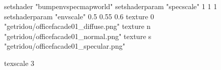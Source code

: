 setshader "bumpenvspecmapworld"
setshaderparam "specscale" 1 1 1
setshaderparam "envscale"  0.5 0.55 0.6
    texture 0 "getridou/officefacade01_diffuse.png"
    texture n "getridou/officefacade01_normal.png"
    texture s "getridou/officefacade01_specular.png"

texscale 3
